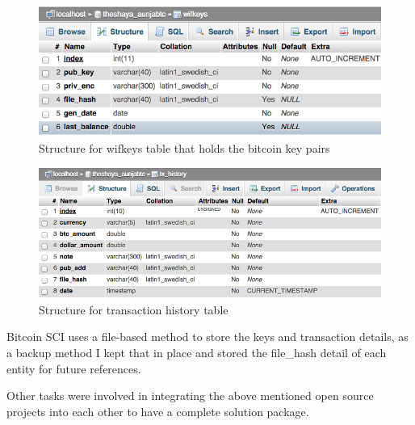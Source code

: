 \begin{figure}[htb!p]
\centering
\includegraphics[scale=0.5]{fig/wifkeys_table.png}
  \caption{Structure for wifkeys table that holds the bitcoin key pairs}
\label{fig:wifkeys}
\end{figure}

\begin{figure}[htb!p]
\centering
\includegraphics[scale=0.5]{fig/tx_history_table.png}
  \caption{Structure for transaction history table}
\label{fig:txhistory}
\end{figure}

Bitcoin SCI uses a file-based method to store the keys and transaction details, as a backup method I kept that in place and stored the file\_hash detail of each entity for future references.

Other tasks were involved in integrating the above mentioned open source projects into each other to have a complete solution package.

